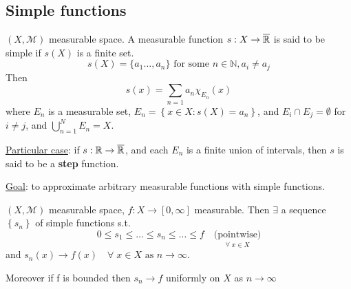 \subsection*{Simple functions}
\begin{definition}
    \((X, \mathcal{M})\) measurable space. A measurable function \(s:X \to \overline{\mathbb{R}}\) is said to be simple if \(s(X)\) is a finite set. 
    \[
        s(X) = \{a_1 \ldots, a_n\} \mbox{ for some }n \in \mathbb{N}, a_i \not= a_j
    \]
    Then 
    \[
        s(x) = \sum_{n = 1} a_n \chi_{E_n}(x)
    \]
    where \(E_n\) is a measurable set, \(E_n = \left\{ x \in X : s(X) = a_n \right\}\), and \(E_i \cap E_j = \emptyset\) for \(i \not = j\), and \(\bigcup_{n = 1}^N E_n = X\).
\end{definition}
\noindent\underline{Particular case}: if \(s: \mathbb{R} \to \overline{\mathbb{R}}\), and each \(E_n\) is a finite union of intervals, then \(s\) is said to be a \textbf{step} function.

\noindent\underline{Goal}: to approximate arbitrary measurable functions with simple functions.
\begin{theorem}
    \((X,\mathcal{M})\) measurable space, \(f: X \to [0, \infty]\) measurable. Then \(\exists\) a sequence \(\left\lbrace s_n \right\rbrace\) of simple functions s.t. 
    \[
        0 \leq s_1 \leq \ldots \leq s_n \leq \ldots \leq f \quad \underset{\forall \; x \in X}{\mbox{(pointwise)}}
    \]
    and \(s_n(x) \to f(x) \quad \forall \; x \in X \mbox{ as }n \to \infty\).

Moreover if f is bounded then \(s_n \to f\) uniformly on \(X\) as \(n \to \infty\)
\end{theorem}

